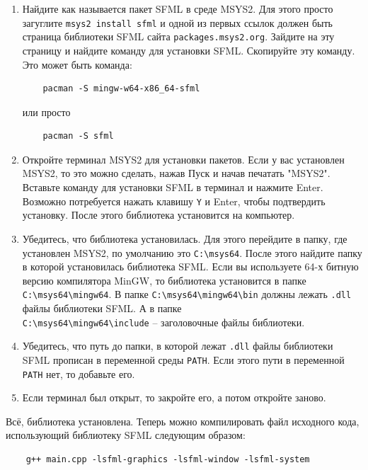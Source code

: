\documentclass{article}
\begin{document}
\begin{enumerate}
\item Найдите как называется пакет SFML в среде MSYS2. Для этого просто загуглите \texttt{msys2 install sfml} и одной из первых ссылок должен быть страница библиотеки SFML сайта \texttt{packages.msys2.org}. Зайдите на эту страницу и найдите команду для установки SFML. Скопируйте эту команду. Это может быть команда:
\begin{verbatim}
    pacman -S mingw-w64-x86_64-sfml
\end{verbatim}
или просто
\begin{verbatim}
    pacman -S sfml
\end{verbatim}
\item Откройте терминал MSYS2 для установки пакетов. Если у вас установлен MSYS2, то это можно сделать, нажав Пуск и начав печатать "MSYS2". Вставьте команду для установки SFML в терминал и нажмите Enter. Возможно потребуется нажать клавишу \texttt{Y} и Enter, чтобы подтвердить установку. После этого библиотека установится на компьютер. 

\item Убедитесь, что библиотека установилась. Для этого перейдите в папку, где установлен MSYS2, по умолчанию это \texttt{C:\textbackslash msys64}. После этого найдите папку в которой установилась библиотека SFML. Если вы используете 64-х битную версию компилятора MinGW, то библиотека установится в папке \texttt{C:\textbackslash msys64\textbackslash mingw64}. В папке \texttt{C:\textbackslash msys64\textbackslash mingw64\textbackslash bin} должны лежать \texttt{.dll} файлы библиотеки SFML. А в папке \\ \texttt{C:\textbackslash msys64\textbackslash mingw64\textbackslash include} -- заголовочные файлы библиотеки.

\item Убедитесь, что путь до папки, в которой лежат \texttt{.dll} файлы библиотеки SFML прописан в переменной среды \texttt{PATH}. Если этого пути в переменной \texttt{PATH} нет, то добавьте его.

\item Если терминал был открыт, то закройте его, а потом откройте заново.
\end{enumerate}
Всё, библиотека установлена. Теперь можно компилировать файл исходного кода, использующий библиотеку SFML следующим образом:
\begin{verbatim}
    g++ main.cpp -lsfml-graphics -lsfml-window -lsfml-system
\end{verbatim}
\end{document}
